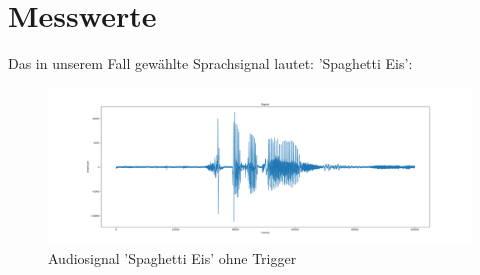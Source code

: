 \documentclass[12pt, oneside, a4paper, \docLanguage]{report}
\begin{document}
\section{Messwerte}
\label{chap:VERSUCH_1_MESSWERTE}
Das in unserem Fall gewählte Sprachsignal lautet: 'Spaghetti Eis':
\begin{figure}[H]
	\centering
	\includegraphics[width=1\textwidth]{../Images/SpaghettiEis.png}
	\caption{Audiosignal 'Spaghetti Eis' ohne Trigger}
\end{figure}
	
	
\end{document}
